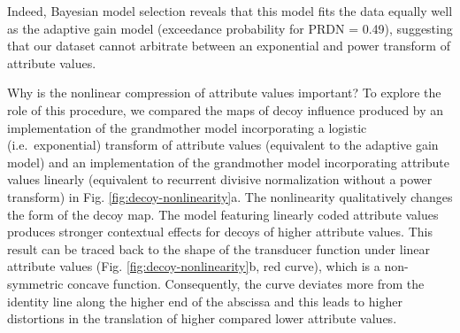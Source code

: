 \documentclass[a4paper, nobind]{templates/ociamthesis}
\begin{document}
Indeed, Bayesian model selection reveals that this model fits the data equally well as the adaptive gain model (exceedance probability for PRDN = 0.49), suggesting that our dataset cannot arbitrate between an exponential and power transform of attribute values.

Why is the nonlinear compression of attribute values important? To explore the role of this procedure, we compared the maps of decoy influence produced by an implementation of the grandmother model incorporating a logistic (i.e.~exponential) transform of attribute values (equivalent to the adaptive gain model) and an implementation of the grandmother model incorporating attribute values linearly (equivalent to recurrent divisive normalization without a power transform) in Fig. \ref{fig:decoy-nonlinearity}a. The nonlinearity qualitatively changes the form of the decoy map. The model featuring linearly coded attribute values produces stronger contextual effects for decoys of higher attribute values. This result can be traced back to the shape of the transducer function under linear attribute values (Fig. \ref{fig:decoy-nonlinearity}b, red curve), which is a non-symmetric concave function. Consequently, the curve deviates more from the identity line along the higher end of the abscissa and this leads to higher distortions in the translation of higher compared lower attribute values.
\end{document}
